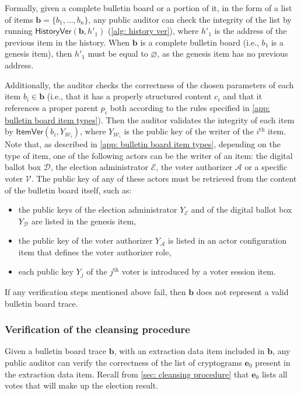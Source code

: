 Formally, given a complete bulletin board or a portion of it, in the form of a list of items $\boldsymbol{b} = \{ b_1, ..., b_n \}$, any public auditor can check the integrity of the list by running $\mathsf{HistoryVer} (\boldsymbol{b}, h'_1)$ (\cref{alg: history ver}), where $h'_1$ is the address of the previous item in the history. When $\boldsymbol{b}$ is a complete bulletin board (i.e., $b_1$ is a genesis item), then $h'_1$ must be equal to $\varnothing$, as the genesis item has no previous address.

Additionally, the auditor checks the correctness of the chosen parameters of each item $b_i \in \boldsymbol{b}$ (i.e., that it has a properly structured content $c_i$ and that it references a proper parent $p_i$ both according to the rules specified in \cref{app: bulletin board item types}). Then the auditor validates the integrity of each item by $\mathsf{ItemVer} (b_i, Y_{\mathcal{W}_i})$, where $Y_{\mathcal{W}_i}$ is the public key of the writer of the $i^\mathrm{th}$ item. Note that, as described in \cref{app: bulletin board item types}, depending on the type of item, one of the following actors can be the writer of an item: the digital ballot box $\mathcal{D}$, the election administrator $\mathcal{E}$, the voter authorizer $\mathcal{A}$ or a specific voter $\mathcal{V}$. The public key of any of these actors must be retrieved from the content of the bulletin board itself, such as:
\begin{itemize}
    \item the public keys of the election administrator $Y_\mathcal{E}$ and of the digital ballot box $Y_\mathcal{D}$ are listed in the genesis item,
    \item the public key of the voter authorizer $Y_\mathcal{A}$ is listed in an actor configuration item that defines the voter authorizer role,
    \item each public key $Y_j$ of the $j^\mathrm{th}$ voter is introduced by a voter session item.
\end{itemize}

If any verification steps mentioned above fail, then $\boldsymbol{b}$ does not represent a valid bulletin board trace.


\subsubsection{Verification of the cleansing procedure} \label{sec: verification of the cleansing procedure}
Given a bulletin board trace $\boldsymbol{b}$, with an extraction data item included in $\boldsymbol{b}$, any public auditor can verify the correctness of the list of cryptograms $\boldsymbol{e}_0$ present in the extraction data item. Recall from \cref{sec: cleansing procedure} that $\boldsymbol{e}_0$ lists all votes that will make up the election result.

